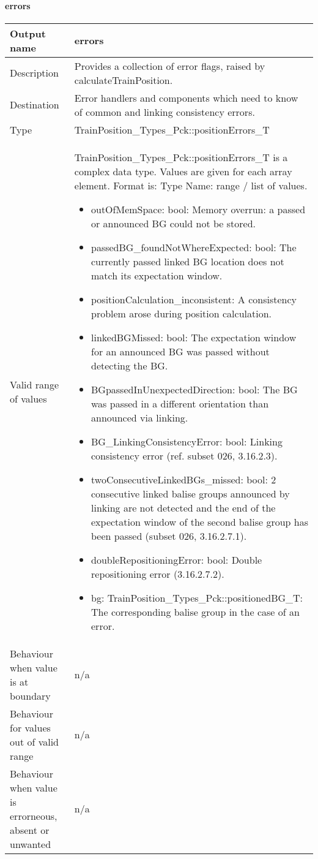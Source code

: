 \paragraph{errors}

\begin{longtable}{p{}p{}}
\toprule
Output name				& errors \\
\midrule
Description				& Provides a collection of error flags, raised by calculateTrainPosition.   \\
\midrule
Destination				& Error handlers and components which need to know of common and linking consistency errors.  \\ 
\midrule
Type					& TrainPosition\_Types\_Pck::positionErrors\_T \\  
\midrule
Valid range of values	& TrainPosition\_Types\_Pck::positionErrors\_T is a complex data type. Values are given for each array element. Format is: Type Name: range / list of values.
\begin{itemize}
\item outOfMemSpace: bool: Memory overrun: a passed or announced BG could not be stored.
\item passedBG\_foundNotWhereExpected: bool: The currently passed linked BG location does not match its expectation window.
\item positionCalculation\_inconsistent: A consistency problem arose during position calculation.
\item linkedBGMissed: bool: The expectation window for an announced BG was passed without detecting the BG.
\item BGpassedInUnexpectedDirection: bool: The BG was passed in a different orientation than announced via linking.
\item BG\_LinkingConsistencyError: bool: Linking consistency error (ref. subset 026, 3.16.2.3).
\item twoConsecutiveLinkedBGs\_missed: bool: 2 consecutive linked balise groups announced by linking are not detected and the end of the expectation window of the second balise group has been passed (subset 026, 3.16.2.7.1).
\item doubleRepositioningError: bool: Double repositioning error (3.16.2.7.2).
\item bg: TrainPosition\_Types\_Pck::positionedBG\_T: The corresponding balise group in the case of an error.
\end{itemize}  \\
\midrule
Behaviour when value is at boundary		& n/a \\
\midrule
Behaviour for values out of valid range	& n/a \\
\midrule
Behaviour when value is errorneous, absent or unwanted & n/a \\
\bottomrule
\end{longtable}



